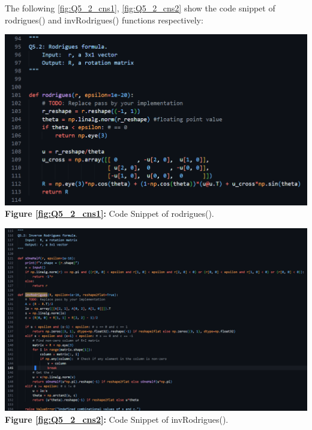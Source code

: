 \begin{your_solution}[title=Q5.2,height=7.5cm,width=\linewidth]
The following \autoref{fig:Q5_2_cns1}, \autoref{fig:Q5_2_cns2} show the code snippet of rodrigues() and invRodrigues() functions respectively:
\newline


\begin{minipage}{0.48\linewidth}
	\centering
	\includegraphics[width=\linewidth]{../Q5_2_cns1.png}
	\textbf{Figure \ref{fig:Q5_2_cns1}:} Code Snippet of rodrigues(). %
	\label{fig:Q5_2_cns1}         %
\end{minipage}
\hfill
\begin{minipage}{0.48\linewidth}
	\centering
	\includegraphics[width=\linewidth]{../Q5_2_cns2.png}
	\textbf{Figure \ref{fig:Q5_2_cns2}:} Code Snippet of invRodrigues().  %
	\label{fig:Q5_2_cns2}         %
\end{minipage}	
\end{your_solution}

